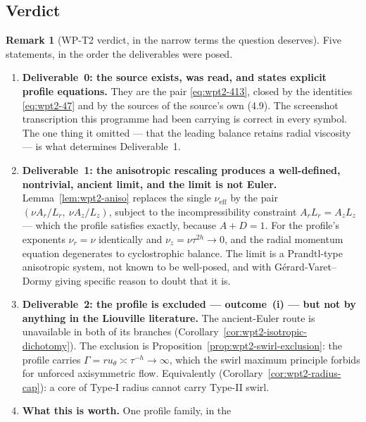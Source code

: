 \documentclass[11pt]{article}
\theoremstyle{definition}
\newtheorem{remark}[theorem]{Remark}
\theoremstyle{remark}
\begin{document}
\subsection{Verdict}
\label{subsec:wpt2-verdict}

\begin{remark}[WP-T2 verdict, in the narrow terms the question deserves]
  \label{rem:wpt2-verdict}
  Five statements, in the order the deliverables were posed.
  \begin{enumerate}[label=\textup{(\arabic*)},leftmargin=2.4em]
    \item \textbf{Deliverable~0: the source exists, was read, and
      states explicit profile equations.} They are the pair
      \eqref{eq:wpt2-413}, closed by the identities
      \eqref{eq:wpt2-47} and by the sources of the source's own (4.9).
      The screenshot transcription this programme had been carrying is
      correct in every symbol. The one thing it omitted --- that the
      leading balance retains radial viscosity --- is what determines
      Deliverable~1.
    \item \textbf{Deliverable~1: the anisotropic rescaling produces a
      well-defined, nontrivial, ancient limit, and the limit is not Euler.}
      Lemma~\ref{lem:wpt2-aniso} replaces the single $\nu_{\mathrm{eff}}$ by
      the pair $(\nu A_r/L_r,\ \nu A_z/L_z)$, subject to the
      incompressibility constraint $A_rL_r=A_zL_z$ --- which the profile
      satisfies exactly, because $A+D=1$. For the profile's exponents
      $\nu_r=\nu$ identically and $\nu_z=\nu\tau^{2h}\to0$, and the radial
      momentum equation degenerates to cyclostrophic balance. The limit is a
      Prandtl-type anisotropic system, not known to be well-posed, and with
      G\'erard-Varet--Dormy giving specific reason to doubt that it is.
    \item \textbf{Deliverable~2: the profile is excluded --- outcome~(i) ---
      but not by anything in the Liouville literature.} The ancient-Euler
      route is unavailable in both of its branches
      (Corollary~\ref{cor:wpt2-isotropic-dichotomy}). The exclusion is
      Proposition~\ref{prop:wpt2-swirl-exclusion}: the profile carries
      $\Gamma=ru_\theta\asymp\tau^{-h}\to\infty$, which the swirl maximum
      principle forbids for unforced axisymmetric flow. Equivalently
      (Corollary~\ref{cor:wpt2-radius-cap}): a core of Type-I radius cannot
      carry Type-II swirl.
    \item \textbf{What this is worth.} One profile family, in the

\end{enumerate}
\end{remark}
\end{document}

